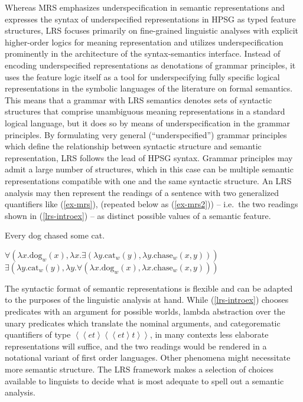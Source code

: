 \documentclass[output=paper
	        ,collection
	        ,collectionchapter
 	        ,biblatex
                ,babelshorthands
                ,newtxmath
                ,draftmode
                ,colorlinks, citecolor=brown
]{langscibook}
\begin{document}
Whereas MRS emphasizes underspecification in semantic representations and expresses the syntax of underspecified representations in HPSG as typed feature structures, LRS focuses primarily on fine-grained linguistic analyses with explicit higher-order logics for meaning representation and utilizes underspecification prominently in the architecture of the syntax-semantics interface. Instead of encoding underspecified representations as denotations of grammar principles, it uses the feature logic itself as a tool for underspecifying fully specific logical representations in the symbolic languages of the literature on formal semantics. This means that a grammar with LRS semantics denotes sets of syntactic structures that comprise unambiguous meaning representations in a standard logical language, but it does so by means of underspecification in the grammar principles. By formulating very general (``underspecified'') grammar principles which define the relationship between syntactic structure and semantic representation, LRS follows the lead of HPSG syntax.
Grammar principles may admit a large number of structures, which in this case can be multiple semantic representations compatible with one and the same syntactic structure. An LRS analysis may then represent the readings of a sentence with two generalized quantifiers like (\ref{ex-mrs}),  (repeated below as (\ref{ex-mrs2})) -- i.e.\ the two readings shown in (\ref{lrs-introex}) -- as distinct possible values of a semantic feature.


\ea
\label{ex-mrs2}
Every dog chased some cat.
\z

\eal
\label{lrs-introex}
\ex\label{lrs-introex1a}
  
  $\forall \left(\lambda x.\text{dog}_w(x),\lambda x.\exists \left(\lambda y.\text{cat}_w(y),\lambda y.\text{chase}_w(x,y)\right)\right)$ 
\ex\label{lrs-introex1b}
  $\exists \left(\lambda y.\text{cat}_w(y),\lambda y.\forall \left(\lambda x.\text{dog}_w(x),\lambda x.\text{chase}_w(x,y)\right)\right)$ 
\zl


The syntactic format of semantic representations is flexible and can be adapted to the purposes of the linguistic analysis at hand. While (\ref{lrs-introex}) chooses predicates with an argument for possible worlds, lambda abstraction over the unary predicates which translate the nominal arguments, and categorematic quantifiers of type ${\left<\left<et\right>\left<\left<et\right>t\right>\right>}$, in many contexts less elaborate representations will suffice, and the two readings would be rendered in a notational variant of first order languages. Other phenomena might necessitate more semantic structure. The LRS framework makes a selection of choices available to linguists to decide what is most adequate to spell out a semantic analysis.
\end{document}
